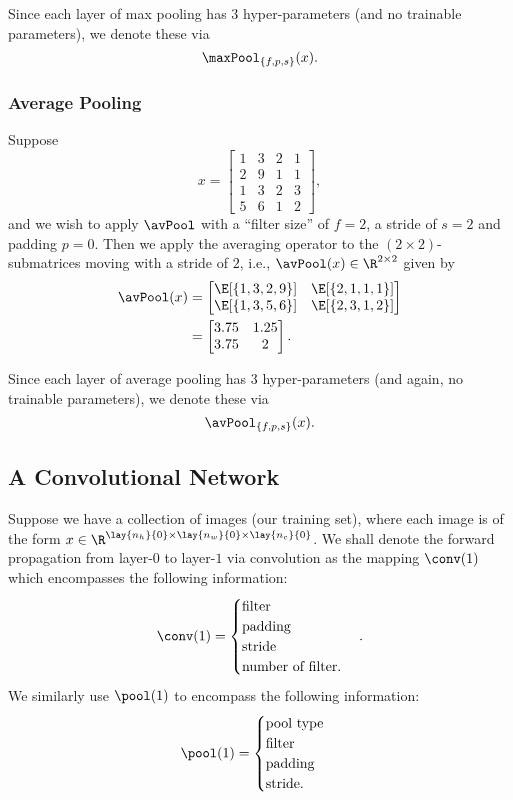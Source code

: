 Since each layer of max pooling has $3$ hyper-parameters (and no trainable parameters), we denote these via
$$\maxPool_{\{f,p,s\}}(x).$$



\subsubsection{Average Pooling}
Suppose
$$x=\begin{bmatrix}
	1&3&2&1\\
	2&9&1&1\\
	1&3&2&3\\
	5&6&1&2
\end{bmatrix},$$
and we wish to apply $\avPool$ with a ``filter size'' of $f=2$, a stride of $s=2$ and padding $p=0$.  Then we apply the averaging operator to the $(2\times 2)$-submatrices moving with a stride of $2$, i.e., $\avPool(x)\in\R^{2\times 2}$ given by
\begin{align*}
	\avPool(x)&=\begin{bmatrix}
		\E[\{1,3,2,9\}]&\E[\{2,1,1,1\}]\\
		\E[\{1,3,5,6\}]&\E[\{2,3,1,2\}]
	\end{bmatrix}\\
	&=\begin{bmatrix}
		3.75&1.25\\
		3.75&2
	\end{bmatrix}.
\end{align*}

Since each layer of average pooling has $3$ hyper-parameters (and again, no trainable parameters), we denote these via
$$\avPool_{\{f,p,s\}}(x).$$




\subsection{A Convolutional Network}

Suppose we have a collection of images (our training set), where each image is of the form $x\in\R^{\lay{n_h}{0}\times\lay{n_w}{0}\times\lay{n_c}{0}}$.  We shall denote the forward propagation from layer-$0$ to layer-$1$ via convolution as the mapping $\conv(1)$ which encompasses the following information:
$$\conv(1)=\begin{cases}
	\text{filter}\\
	\text{padding}\\
	\text{stride}\\
	\text{number of filter}.
\end{cases}.$$
We similarly use $\pool(1)$ to encompass the following information:
$$\pool(1)=\begin{cases}
	\text{pool type}\\
	\text{filter}\\
	\text{padding}\\
	\text{stride}.
\end{cases}$$

